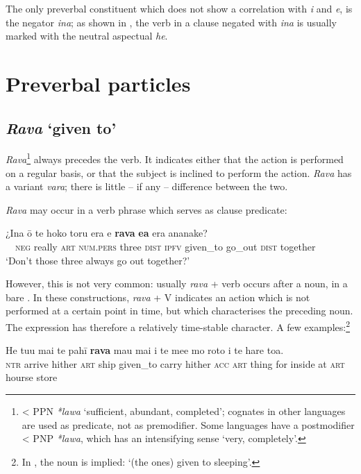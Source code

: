 The only preverbal constituent which does not show a correlation with \textit{i} and \textit{e}, is the negator \textit{{\ꞌ}ina}; as shown in , the verb in a clause negated with \textit{{\ꞌ}ina} is usually marked with the neutral aspectual \textit{he}.
\section{Preverbal particles}\label{sec:7.3}
\subsection{\textit{Rava} ‘given to’}\label{sec:7.3.1}
\textit{Rava}\footnote{\label{fn:340}{\textless} PPN \textit{*lawa} ‘sufficient, abundant, completed’; cognates in other languages are used as predicate, not as premodifier. Some languages have a postmodifier {\textless} PNP \textit{*lawa}, which has an intensifying sense ‘very, completely’.} always precedes the verb. It indicates either that the action is performed on a regular basis, or that the subject is inclined to perform the action. \textit{Rava} has a variant \textit{vara}; there is little – if any – difference between the two.

\textit{Rava} may occur in a verb phrase which serves as clause predicate:

\ea\label{ex:7.85}
\gll ¿{\ꞌ}Ina {\ꞌ}ō te hoko toru era e \textbf{rava} \textbf{e{\ꞌ}a} era ananake? \\
~~\textsc{neg} really \textsc{art} \textsc{num.pers} three \textsc{dist} \textsc{ipfv} given\_to go\_out \textsc{dist} together \\

\glt
‘Don’t those three always go out together?’ \textstyleExampleref{[R366.044]} 
\z

However, this is not very common: usually \textit{rava} + verb occurs after a noun, in a bare . In these constructions, \textit{rava} + V indicates an action which is not performed at a certain point in time, but which characterises the preceding noun. The expression has therefore a relatively time-stable character. A few examples:\footnote{\label{fn:341}In , the noun is implied: ‘(the ones) given to sleeping’.}

\ea\label{ex:7.86}
\gll He tu{\ꞌ}u mai te pahī \textbf{rava} ma{\ꞌ}u mai i te me{\ꞌ}e mo roto  i te hare toa.\\
\textsc{ntr} arrive hither \textsc{art} ship given\_to carry hither \textsc{acc} \textsc{art} thing for inside  at \textsc{art} hourse store\\

